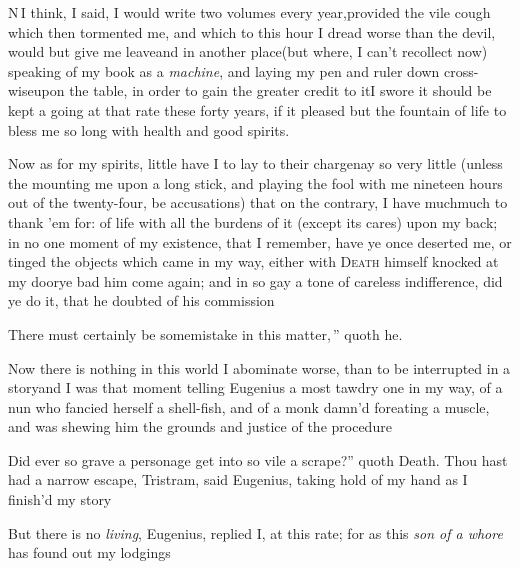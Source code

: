 \documentclass{article}
\begin{document}
\lettrine{N}{\,}\tsh I think, I said, I
would write two volumes every year,\break provided the vile cough which
then tormented me, and which to this hour I dread worse than the
devil, would but give me leave\tsk and in another
place\tsk (but where, I can’t recollect now) speaking of my
book as a \textit{machine}, and laying my pen and ruler down
cross-wise\pb upon the table, in order to gain the greater credit to
it\tsk I swore it should be kept a going at that rate these forty
years, if it pleased but the fountain of life to bless me so long
with health and good spirits.

Now as for my spirits, little have I to lay to their
charge\tsk nay so very little (unless the mounting me upon a long
stick, and playing the fool with me nineteen hours out of the
twenty-four, be accusations) that on the contrary, I have
much\tsk much to thank ’em for:\break 
{}
of life with all the burdens of it (except its
cares) upon my back; in no one moment of my existence, that I
remember, have ye once deserted me, or tinged the objects which
came in my way, either with\pb
{}
\textsc{Death} himself knocked at my door\tsk ye bad him
come again; and in so gay a tone of careless indifference, did ye
do it, that he doubted of his commission\tsh

\indent\lqq\tsh There must certainly be some\break\lqq mistake in this
matter,\,” quoth he.

Now there is nothing in this world I abominate worse, than to be
interrupted in a story\tsh and I was that moment telling
Eugenius a most tawdry one in my way, of a nun who fancied
herself a shell-fish, and of a monk damn’d for\break eating a
muscle, and was shewing him the grounds and justice of the
procedure\tsh

\newpage
\noindent\lqq\tsk Did ever so grave a personage\break
\lqq get into so vile a scrape?” quoth\break
Death. Thou hast had a narrow escape,
Tristram, said Eugenius, taking hold of my hand as I
finish’d my story\tsh

But there is no \textit{living}, Eugenius, replied I, at this
rate; for as this \textit{son of a whore} has found out my
lodgings\tsh
\end{document}
